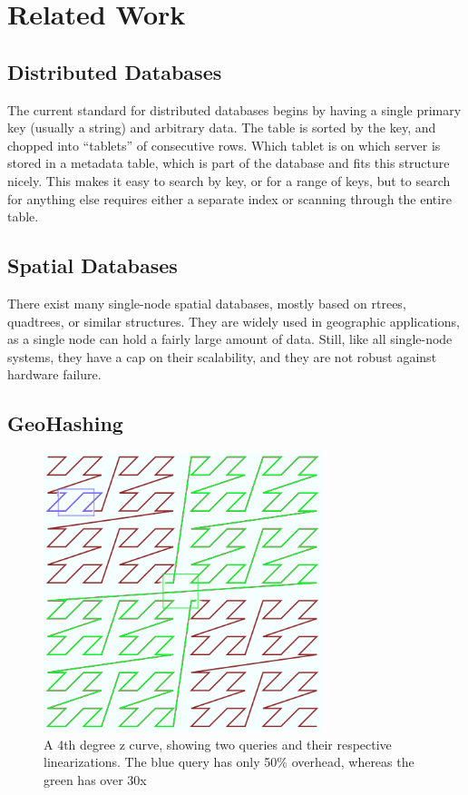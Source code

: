 \documentclass[11pt]{article}
\begin{document}
\section{Related Work}

\subsection{Distributed Databases}

The current standard for distributed databases begins by having a single primary key (usually a string) and arbitrary data. The table is sorted by the key, and chopped into ``tablets'' of consecutive rows. Which tablet is on which server is stored in a metadata table, which is part of the database and fits this structure nicely. This makes it easy to search by key, or for a range of keys, but to search for anything else requires either a separate index or scanning through the entire table.

\subsection{Spatial Databases}

There exist many single-node spatial databases, mostly based on rtrees\cite{rtrees}, quadtrees\cite{quadtrees}, or similar structures\cite{samet}. They are widely used in geographic applications, as a single node can hold a fairly large amount of data. Still, like all single-node systems, they have a cap on their scalability, and they are not robust against hardware failure.

\subsection{GeoHashing}

\begin{figure}[b!]
\centering
\includegraphics[width=3.2in]{geohash}
\caption{A 4th degree z curve, showing two queries and their respective linearizations.  The blue query has only 50\% overhead, whereas the green has over 30x}
\label{fig:z}
\end{figure}
\end{document}
